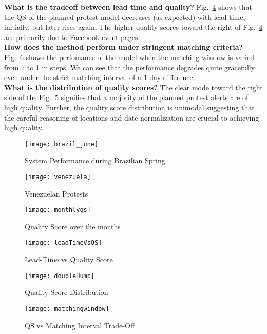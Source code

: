 \noindent
{\bf What is the tradeoff between lead time and quality?}
Fig.~\ref{fig:leadTimeVsQS} shows that the QS of the planned protest model decreases (as expected) with lead time, initially, but
later rises again. The higher quality scores toward the right of Fig.~\ref{fig:leadTimeVsQS} are primarily due to
Facebook event pages.\\

\noindent
{\bf How does the method perform under stringent matching criteria?}
Fig.~\ref{fig:matchinginterval} shows the perfomance of the model when the matching window is varied from 7 to 1 in steps. 
We can see that the performance degrades quite gracefully even under the strict matching interval of a 1-day difference.\\

\noindent
{\bf What is the distribution of quality scores?}
The clear mode toward the right side of the Fig.~\ref{fig:doubleHump} signifies that a majority of the planned 
protest alerts are of high quality. Further, the quality score distribution is unimodal suggesting that the careful
reasoning of locations and date normalization are crucial to achieving high quality.

\begin{figure*}
\centering
\begin{subfigure}{\columnwidth}
  \centering
  \texttt{[image: brazil\_june]}
  \caption{System Performance during Brazilian Spring}
  \label{fig:brazil_june}
\end{subfigure}%
\begin{subfigure}{\columnwidth}
  \centering
  \texttt{[image: venezuela]}
  \caption{Venezuelan Protests}
  \label{fig:venezuela_feb}
\end{subfigure}
\begin{subfigure}{\columnwidth}
  \centering
  \texttt{[image: monthlyqs]}
  \caption{Quality Score over the months}
  \label{fig:monthlyqs}
\end{subfigure}
\begin{subfigure}{\columnwidth}
  \centering
  \texttt{[image: leadTimeVsQS]}
  \caption{Lead-Time vs Quality Score}
  \label{fig:leadTimeVsQS}
\end{subfigure}%
\begin{subfigure}{\columnwidth}
  \centering
  \texttt{[image: doubleHump]}
  \caption{Quality Score Distribution}
  \label{fig:doubleHump}
\end{subfigure}
\begin{subfigure}{\columnwidth}
  \centering
  \texttt{[image: matchingwindow]}
  \caption{QS vs Matching Interval Trade-Off}
  \label{fig:matchinginterval}
\end{subfigure}%
\caption{Experiments}
\end{figure*}

